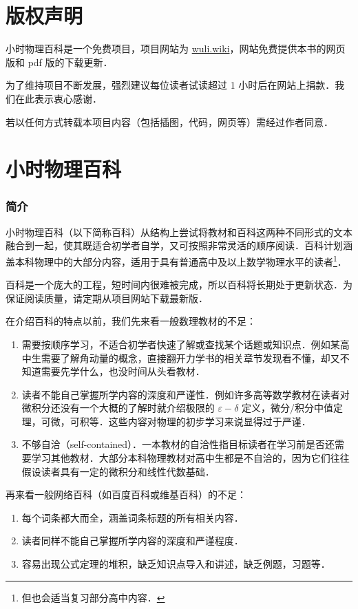 
\chapter*{版权声明}

小时物理百科是一个免费项目，项目网站为 \href{http://wuli.wiki}{wuli.wiki}，网站免费提供本书的网页版和 pdf 版的下载更新．

为了维持项目不断发展，强烈建议每位读者试读超过 1 小时后在网站上捐款．我们在此表示衷心感谢．

若以任何方式转载本项目内容（包括插图，代码，网页等）需经过作者同意．

\chapter*{小时物理百科}

\subsection{简介}

小时物理百科（以下简称百科）从结构上尝试将教材和百科这两种不同形式的文本融合到一起，使其既适合初学者自学，又可按照非常灵活的顺序阅读．百科计划涵盖本科物理中的大部分内容，适用于具有普通高中及以上数学物理水平的读者\footnote{但也会适当复习部分高中内容．}．

百科是一个庞大的工程，短时间内很难被完成，所以百科将长期处于更新状态．为保证阅读质量，请定期从项目网站下载最新版．

在介绍百科的特点以前，我们先来看一般数理教材的不足：
\begin{enumerate}
\item 需要按顺序学习，不适合初学者快速了解或查找某个话题或知识点．例如某高中生需要了解角动量的概念，直接翻开力学书的相关章节发现看不懂，却又不知道需要先学什么，也没时间从头看教材．
\item 读者不能自己掌握所学内容的深度和严谨性．例如许多高等数学教材在读者对微积分还没有一个大概的了解时就介绍极限的 $\varepsilon-\delta$ 定义，微分/积分中值定理，可微，可积等．这些内容对物理的初步学习来说显得过于严谨．
\item 不够自洽（self-contained）．一本教材的自洽性指目标读者在学习前是否还需要学习其他教材．大部分本科物理教材对高中生都是不自洽的，因为它们往往假设读者具有一定的微积分和线性代数基础．
\end{enumerate}

再来看一般网络百科（如百度百科或维基百科）的不足：
\begin{enumerate}
\item 每个词条都大而全，涵盖词条标题的所有相关内容．
\item 读者同样不能自己掌握所学内容的深度和严谨程度．
\item 容易出现公式定理的堆积，缺乏知识点导入和讲述，缺乏例题，习题等．
\end{enumerate}

